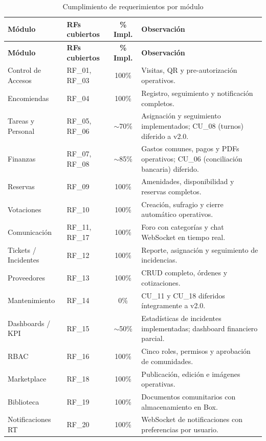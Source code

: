 \begin{longtable}{|p{}|p{}|c|p{}|}
\caption{Cumplimiento de requerimientos por módulo}\label{tab:cumplimiento}\\
\hline
\textbf{Módulo} & \textbf{RFs cubiertos} & \textbf{\% Impl.} & \textbf{Observación} \\
\hline
\endfirsthead
\hline
\textbf{Módulo} & \textbf{RFs cubiertos} & \textbf{\% Impl.} & \textbf{Observación} \\
\hline
\endhead
\hline
\endfoot

Control de Accesos & RF\_01, RF\_03 & 100\% & Visitas, QR y pre-autorización operativos. \\
\hline
Encomiendas & RF\_04 & 100\% & Registro, seguimiento y notificación completos. \\
\hline
Tareas y Personal & RF\_05, RF\_06 & $\sim$70\% & Asignación y seguimiento implementados; CU\_08 (turnos) diferido a v2.0. \\
\hline
Finanzas & RF\_07, RF\_08 & $\sim$85\% & Gastos comunes, pagos y PDFs operativos; CU\_06 (conciliación bancaria) diferido. \\
\hline
Reservas & RF\_09 & 100\% & Amenidades, disponibilidad y reservas completos. \\
\hline
Votaciones & RF\_10 & 100\% & Creación, sufragio y cierre automático operativos. \\
\hline
Comunicación & RF\_11, RF\_17 & 100\% & Foro con categorías y chat WebSocket en tiempo real. \\
\hline
Tickets / Incidentes & RF\_12 & 100\% & Reporte, asignación y seguimiento de incidencias. \\
\hline
Proveedores & RF\_13 & 100\% & CRUD completo, órdenes y cotizaciones. \\
\hline
Mantenimiento & RF\_14 & 0\% & CU\_11 y CU\_18 diferidos íntegramente a v2.0. \\
\hline
Dashboards / KPI & RF\_15 & $\sim$50\% & Estadísticas de incidentes implementadas; dashboard financiero parcial. \\
\hline
RBAC & RF\_16 & 100\% & Cinco roles, permisos y aprobación de comunidades. \\
\hline
Marketplace & RF\_18 & 100\% & Publicación, edición e imágenes operativas. \\
\hline
Biblioteca & RF\_19 & 100\% & Documentos comunitarios con almacenamiento en Box. \\
\hline
Notificaciones RT & RF\_20 & 100\% & WebSocket de notificaciones con preferencias por usuario. \\

\end{longtable}

